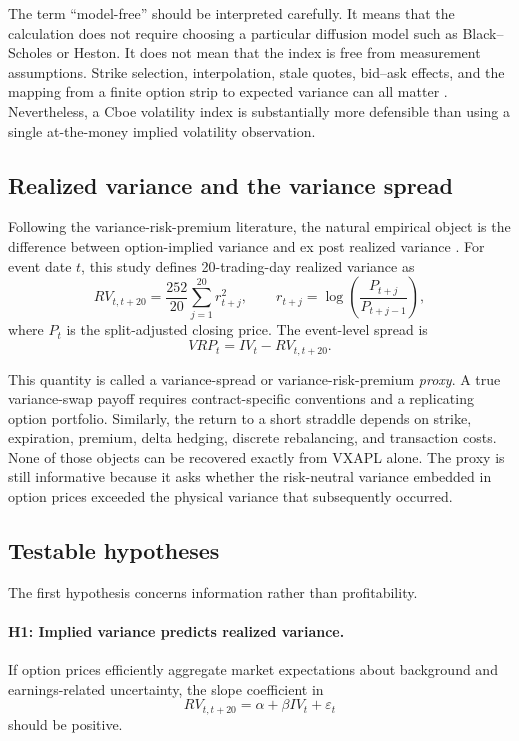 \documentclass[11pt]{article}
\begin{document}
The term ``model-free'' should be interpreted carefully. It means that the calculation does not require choosing a particular diffusion model such as Black--Scholes or Heston. It does not mean that the index is free from measurement assumptions. Strike selection, interpolation, stale quotes, bid--ask effects, and the mapping from a finite option strip to expected variance can all matter \citep{jiang2005model}. Nevertheless, a Cboe volatility index is substantially more defensible than using a single at-the-money implied volatility observation.

\subsection{Realized variance and the variance spread}

Following the variance-risk-premium literature, the natural empirical object is the difference between option-implied variance and ex post realized variance \citep{bollerslev2009vrp}. For event date $t$, this study defines 20-trading-day realized variance as
\begin{equation}
RV_{t,t+20}
=
\frac{252}{20}\sum_{j=1}^{20} r_{t+j}^{2},
\qquad
r_{t+j}=\log\left(\frac{P_{t+j}}{P_{t+j-1}}\right),
\end{equation}
where $P_t$ is the split-adjusted closing price. The event-level spread is
\begin{equation}
VRP_t = IV_t - RV_{t,t+20}.
\end{equation}

This quantity is called a variance-spread or variance-risk-premium \emph{proxy}. A true variance-swap payoff requires contract-specific conventions and a replicating option portfolio. Similarly, the return to a short straddle depends on strike, expiration, premium, delta hedging, discrete rebalancing, and transaction costs. None of those objects can be recovered exactly from VXAPL alone. The proxy is still informative because it asks whether the risk-neutral variance embedded in option prices exceeded the physical variance that subsequently occurred.

\subsection{Testable hypotheses}

The first hypothesis concerns information rather than profitability.

\paragraph{H1: Implied variance predicts realized variance.}
If option prices efficiently aggregate market expectations about background and earnings-related uncertainty, the slope coefficient in
\begin{equation}
RV_{t,t+20}=\alpha+\beta IV_t+\varepsilon_t
\end{equation}
should be positive.
\end{document}
